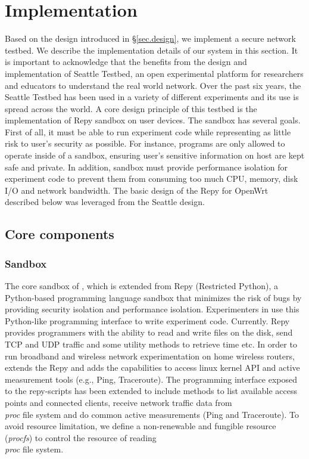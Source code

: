 \chapter{Implementation} 
\label{sec.implementation}

Based on the design introduced in \S{\ref{sec.design}}, we implement a 
secure network testbed. We describe the implementation details of our system 
in this section. It is important to acknowledge that the \sysname benefits from the design and implementation of Seattle Testbed, an open experimental platform for researchers and educators to understand the real world network. Over the past six years, the Seattle Testbed has been used in a variety of different experiments and its use is spread across the world. A core design principle of this testbed is the implementation of Repy sandbox on user devices. The sandbox has several goals. First of all, it must be able to run experiment code while representing as little risk to user's security as possible. For instance, programs are only allowed to operate inside of a sandbox, ensuring user's sensitive information on host are kept safe and private. In addition, sandbox must provide performance isolation for experiment code to prevent them from consuming too much CPU, memory, disk I/O and network bandwidth. The basic design of the Repy for OpenWrt described below was leveraged from the Seattle design.

\section{Core components}
\subsection{Sandbox}
\label{sec.sandbox}
The core sandbox of \sandboxname, which is extended from Repy (Restricted Python), a Python-based programming language sandbox that minimizes the risk of bugs by providing security isolation and performance isolation. Experimenters in \sysname use this Python-like programming interface to write experiment code. Currently. Repy provides programmers with the ability to read and write files on the disk, send TCP and UDP traffic and some utility methods to retrieve time etc. In order to run broadband and wireless network experimentation on home wireless routers, \sysname extends the Repy and adds the capabilities to access linux kernel API and active measurement tools (e.g., Ping, Traceroute). The programming interface exposed to the repy-scripts has been extended to include methods to list available access points and connected clients, receive network traffic data from \textit{\\proc} file system and do common active measurements (Ping and Traceroute). To avoid resource limitation, we define a non-renewable and fungible resource\cite{li2015fence} (\textit{procfs}) to control the resource of reading \textit{\\proc} file system. 

